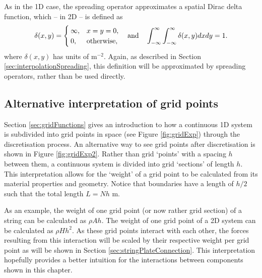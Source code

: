 As in the 1D case, the spreading operator approximates a spatial Dirac delta function, which -- in 2D -- is defined as 
\begin{equation}\label{eq:spatialDirac2D}
    \delta(x,y)= \begin{cases}
        \infty, & x = y = 0,\\
        0, & \text{otherwise},
    \end{cases} \quad \text{and} \quad \int_{-\infty}^{\infty} \int_{-\infty}^{\infty} \delta(x,y)dxdy = 1.
\end{equation}
where $\delta(x,y)$ has units of m$^{-2}$. Again, as described in Section \ref{sec:interpolationSpreading}, this definition will be approximated by spreading operators, rather than be used directly. 

\subsection{Alternative interpretation of grid points}\label{sec:alternativeInterp}
Section \ref{sec:gridFunctions} gives an introduction to how a continuous 1D system is subdivided into grid points in space (see Figure \ref{fig:gridExp}) through the discretisation process. An alternative way to see grid points after discretisation is shown in Figure \ref{fig:gridExp2}. Rather than grid `points' with a spacing $h$ between them, a continuous system is divided into grid `sections' of length $h$. This interpretation allows for the `weight' of a grid point to be calculated from its material properties and geometry. Notice that boundaries have a length of $h/2$ such that the total length $L = Nh$ m.

As an example, the weight of one grid point (or now rather grid section) of a string can be calculated as $\rho A h$. The weight of one grid point of a 2D system can be calculated as $\rho H h^2$. As these grid points interact with each other, the forces resulting from this interaction will be scaled by their respective weight per grid point as will be shown in Section \ref{sec:stringPlateConnection}.
This interpretation hopefully provides a better intuition for the interactions between components shown in this chapter. 

